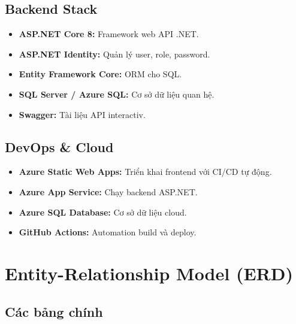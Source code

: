 \documentclass[12pt,a4paper,oneside]{report}
\begin{document}
\subsection{Backend Stack}
\begin{itemize}[itemsep=2pt]
  \item \textbf{ASP.NET Core 8:} Framework web API .NET.
  \item \textbf{ASP.NET Identity:} Quản lý user, role, password.
  \item \textbf{Entity Framework Core:} ORM cho SQL.
  \item \textbf{SQL Server / Azure SQL:} Cơ sở dữ liệu quan hệ.
  \item \textbf{Swagger:} Tài liệu API interactiv.
\end{itemize}

\subsection{DevOps \& Cloud}
\begin{itemize}[itemsep=2pt]
  \item \textbf{Azure Static Web Apps:} Triển khai frontend với CI/CD tự động.
  \item \textbf{Azure App Service:} Chạy backend ASP.NET.
  \item \textbf{Azure SQL Database:} Cơ sở dữ liệu cloud.
  \item \textbf{GitHub Actions:} Automation build và deploy.
\end{itemize}

\section{Entity-Relationship Model (ERD)}

\subsection{Các bảng chính}
\end{document}
